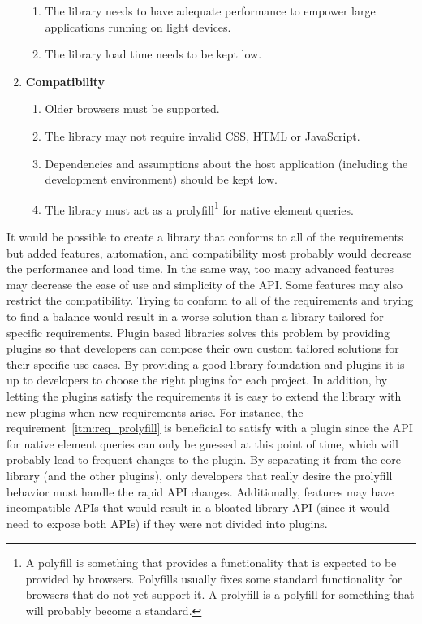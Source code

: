 \documentclass[a4paper,11pt]{kth-mag}
\begin{document}
\begin{enumerate}
\begin{enumerate}
            \item\label{itm:req_performance}      The library needs to have adequate performance to empower large applications running on light devices.
            \item                                 The library load time needs to be kept low.
          \end{enumerate}
        \item \textbf{Compatibility}
          \begin{enumerate}
            \item                                 Older \glspl{browser} must be supported.
            \item\label{itm:req_valid_syntax}     The library may not require invalid \gls{CSS}, \gls{HTML} or \gls{JavaScript}.
            \item\label{itm:assumption}           Dependencies and assumptions about the host application (including the development environment) should be kept low.
            \item\label{itm:req_prolyfill}        The library must act as a prolyfill\footnote{A polyfill is something that provides a functionality that is expected to be provided  by \glspl{browser}. Polyfills usually fixes some standard functionality for \glspl{browser} that do not yet support it. A prolyfill is a polyfill for something that will probably become a standard.} for \gls{native} element queries.
          \end{enumerate}
      \end{enumerate}
      It would be possible to create a library that conforms to all of the requirements but added features, automation, and compatibility most probably would decrease the performance and load time.
      In the same way, too many advanced features may decrease the ease of use and simplicity of the \gls{API}.
      Some features may also restrict the compatibility.
      Trying to conform to all of the requirements and trying to find a balance would result in a worse solution than a library tailored for specific requirements.
      Plugin based libraries solves this problem by providing plugins so that developers can compose their own custom tailored solutions for their specific use cases.
      By providing a good library foundation and plugins it is up to developers to choose the right plugins for each project.
      In addition, by letting the plugins satisfy the requirements it is easy to extend the library with new plugins when new requirements arise.
      For instance, the requirement~\ref{itm:req_prolyfill} is beneficial to satisfy with a plugin since the \gls{API} for \gls{native} element queries can only be guessed at this point of time, which will probably lead to frequent changes to the plugin.
      By separating it from the core library (and the other plugins), only developers that really desire the prolyfill behavior must handle the rapid \gls{API} changes.
      Additionally, features may have incompatible \glspl{API} that would result in a bloated library \gls{API} (since it would need to expose both \glspl{API}) if they were not divided into plugins.
\end{document}
